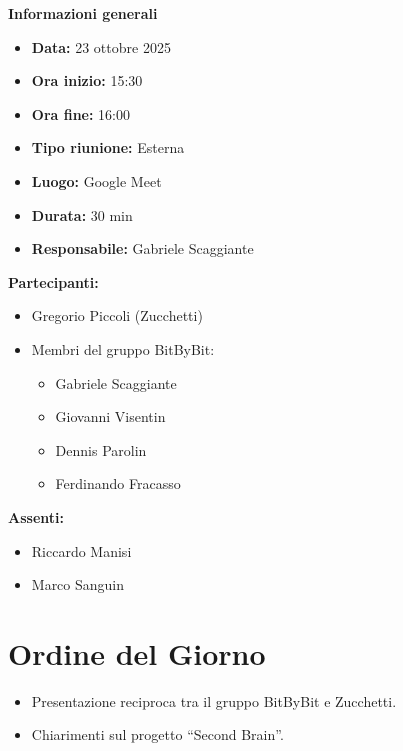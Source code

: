 \documentclass[a4paper,12pt]{article}
\begin{document}
{\large \textbf{Informazioni generali}}
{\footnotesize
{}

\begin{itemize}
    \item \textbf{Data:} 23 ottobre 2025
    \item \textbf{Ora inizio:} 15:30
    \item \textbf{Ora fine:} 16:00
    \item \textbf{Tipo riunione:} Esterna
    \item \textbf{Luogo:} Google Meet
    \item \textbf{Durata:} 30 min
    \item \textbf{Responsabile:} Gabriele Scaggiante
\end{itemize}

\vspace{0.2cm}

\textbf{Partecipanti:}
\begin{itemize}
    \item Gregorio Piccoli (Zucchetti)
    \item Membri del gruppo BitByBit:
    \begin{itemize}
        \item Gabriele Scaggiante
        \item Giovanni Visentin
        \item Dennis Parolin
        \item Ferdinando Fracasso
    \end{itemize}
\end{itemize}

\textbf{Assenti:}
\begin{itemize}
    \item Riccardo Manisi
    \item Marco Sanguin
\end{itemize}
}

\vspace{0.8cm}

\clearpage
\tableofcontents
\thispagestyle{empty}
\clearpage

\section{Ordine del Giorno}
\begin{itemize}
    \item Presentazione reciproca tra il gruppo BitByBit e Zucchetti.
    \item Chiarimenti sul progetto “Second Brain”.
\end{itemize}
\end{document}
